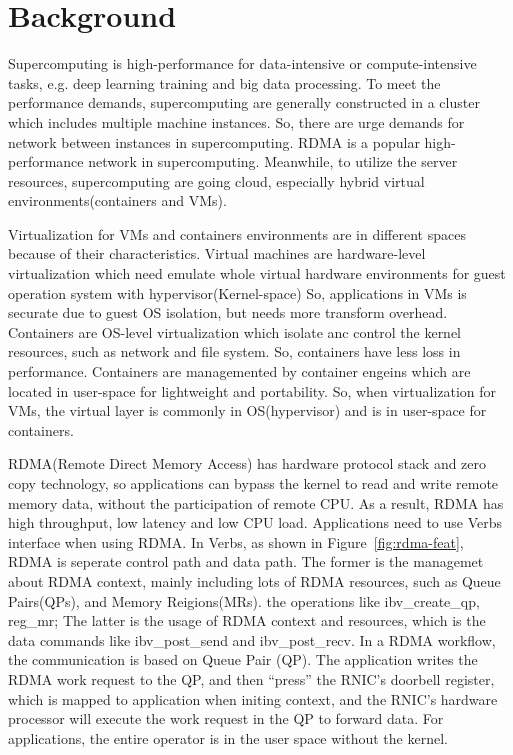\section{Background}

Supercomputing is high-performance for data-intensive or compute-intensive tasks, e.g. deep learning training and big data processing. To meet the performance demands, supercomputing are generally constructed in a cluster which includes multiple machine instances. So, there are urge demands for network between instances in supercomputing. RDMA is a popular high-performance network in supercomputing. Meanwhile, to utilize the server resources, supercomputing are going cloud, especially hybrid virtual environments(containers and VMs).

Virtualization for VMs and containers environments are in different spaces because of their characteristics. Virtual machines are hardware-level virtualization which need emulate whole virtual hardware environments for guest operation system with hypervisor(Kernel-space) So, applications in VMs is securate due to guest OS isolation, but needs more transform overhead. Containers are OS-level virtualization which isolate anc control the kernel resources, such as network and file system. So, containers have less loss in performance. Containers are managemented by container engeins which are located in user-space for lightweight and portability. So, when virtualization for VMs, the virtual layer is commonly in OS(hypervisor) and is in user-space for containers.

RDMA(Remote Direct Memory Access) has hardware protocol stack and zero copy technology, so applications can bypass the kernel to read and write remote memory data, without the participation of remote CPU. As a result, RDMA has high throughput, low latency and low CPU load. Applications need to use Verbs interface when using RDMA. In Verbs, as shown in Figure~\ref{fig:rdma-feat}, RDMA is seperate control path and data path. The former is the managemet about RDMA context, mainly including lots of RDMA resources, such as Queue Pairs(QPs), and Memory Reigions(MRs). the operations like ibv\_create\_qp, reg\_mr; The latter is the usage of RDMA context and resources,  which is the data commands like ibv\_post\_send and ibv\_post\_recv. In a RDMA workflow, the communication is based on Queue Pair (QP). The application writes the RDMA work request to the QP, and then ``press''  the RNIC's doorbell register, which is mapped to application when initing context, and the RNIC's hardware processor will execute the work request in the QP to forward data. For applications, the entire operator is in the user space without the kernel.

